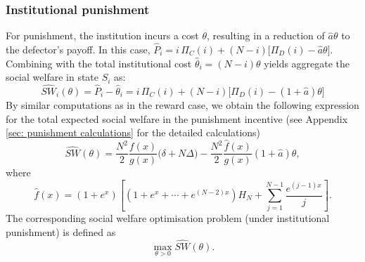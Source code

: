 \documentclass{article}
\begin{document}
\subsubsection{Institutional punishment}
For punishment, the institution incurs a cost $\theta$, resulting in a reduction of $\hat{a}\theta$ to the defector's payoff. In this case, $
\hat{P}_i = i\,\Pi_C(i) + (N - i)\big[ \Pi_D(i) - \hat{a}\theta \big].$ Combining with the total institutional cost $\hat{\theta}_i = (N - i)\theta$ yields aggregate the social welfare in state $S_i$ as:
\begin{equation*}
\widehat{SW}_i(\theta) = \hat{P}_i - \hat{\theta}_i =  i\,\Pi_C(i) + (N - i)\big[ \Pi_D(i) - (1+\hat{a})\theta \big]
\end{equation*}
By similar computations as in the reward case, we obtain the following expression for the total expected social welfare in the punishment incentive (see Appendix \ref{sec: punishment calculations} for the  detailed calculations)
\begin{equation}
\widehat{SW}(\theta)= \frac{N^2}{2}\frac{f(x)}{g(x)} \big(\delta + N\Delta) - \frac{N^2}{2}\frac{\hat{f}(x)}{g(x)}(1+\hat{a})\theta, \label{eq:swp0}   
\end{equation}
where
\[
\hat{f}(x) = (1 + e^x)\left[ \left(1 + e^x + \cdots + e^{(N-2)x}\right) H_N 
+ \sum_{j=1}^{N-1} \frac{e^{(j-1)x}}{j} \right].
\]
The corresponding social welfare optimisation problem (under institutional punishment) is  defined  as
\begin{equation} 
\label{eq: max SWp}\max_{\theta>0}\widehat{SW}(\theta).
\end{equation}
\end{document}
